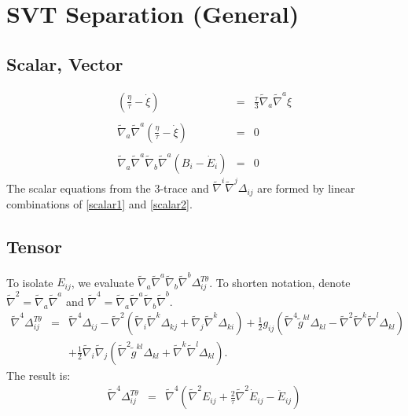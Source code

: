 \documentclass[10pt,letterpaper]{article}
\numberwithin{equation}{section}
\begin{document}
\section{SVT Separation (General)}
%
\subsection{Scalar, Vector}
%
\begin{eqnarray}
\left(\frac{\eta}{\tau} - \dot\xi \right) &=& \frac{\tau}{3} \tilde\nabla_a\tilde\nabla^a \xi
\label{scalar1}
\\ \nonumber\\
\tilde\nabla_a\tilde\nabla^a\left( \frac{\eta}{\tau} - \dot\xi\right) &=& 0
\label{scalar2}
\\ \nonumber\\
\tilde\nabla_a\tilde\nabla^a\tilde\nabla_b\tilde\nabla^a (B_i-\dot E_i) &=&0
\label{vect1}
\end{eqnarray}
The scalar equations from the 3-trace and $\tilde\nabla^i\tilde\nabla^j \Delta_{ij}$ are formed by linear combinations of \eqref{scalar1} and \eqref{scalar2}.
%
%
\subsection{Tensor}
%
To isolate $E_{ij}$, we evaluate $\tilde\nabla_a\tilde\nabla^a\tilde\nabla_b\tilde\nabla^b \Delta_{ij}^{T\theta}$. To shorten notation, denote $\tilde \nabla^2 = \tilde\nabla_a\tilde\nabla^a$ and $\tilde \nabla^4 =\tilde\nabla_a\tilde\nabla^a\tilde\nabla_b\tilde\nabla^b$. 
\begin{eqnarray}
\tilde\nabla^4 \Delta_{ij}^{T\theta} &=&
\tilde\nabla^4 \Delta_{ij} - \tilde\nabla^2( \tilde\nabla_i \tilde\nabla^k\Delta_{kj} + \tilde\nabla_j \tilde\nabla^k \Delta_{ki})
+\frac{1}{2}g_{ij}( \tilde\nabla^4 \tilde g^{kl}\Delta_{kl}-\tilde\nabla^2\tilde\nabla^k \tilde\nabla^l \Delta_{kl})
\nonumber\\
&&+\frac12 \tilde\nabla_i\tilde\nabla_j(\tilde\nabla^2\tilde g^{kl}\Delta_{kl}+\tilde\nabla^k\tilde\nabla^l \Delta_{kl}).
\end{eqnarray}
The result is:
\begin{eqnarray}
\tilde\nabla^4 \Delta^{T\theta}_{ij} &=& \tilde\nabla^4\left(
\tilde\nabla^2 E_{ij} +\frac{2}{\tau} \tilde\nabla^2 \dot E_{ij} -\ddot E_{ij} \right)
\end{eqnarray}
%
%
\end{document}
